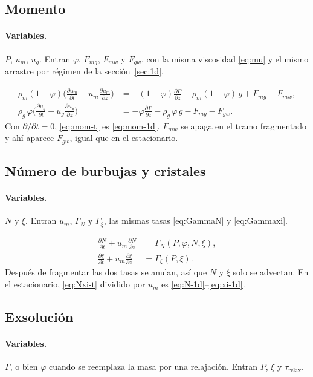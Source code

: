 \documentclass[11pt,a4paper]{article}
\newcommand{\p}{\partial}
\begin{document}
\subsection{Momento}

\paragraph{Variables.}
$P$, $u_m$, $u_g$. Entran $\varphi$, $F_{mg}$, $F_{mw}$ y $F_{gw}$,
con la misma viscosidad \eqref{eq:mu} y el mismo arrastre por
régimen de la sección~\ref{sec:1d}.

\begin{align}
\label{eq:mom-t}
\rho_m(1-\varphi)\Biggl(
\frac{\p u_m}{\p t}+u_m\frac{\p u_m}{\p z}
\Biggr)
&=
-(1-\varphi)\frac{\p P}{\p z}
-\rho_m(1-\varphi)\,g
+F_{mg}-F_{mw},
\\
\rho_g\,\varphi\Biggl(
\frac{\p u_g}{\p t}+u_g\frac{\p u_g}{\p z}
\Biggr)
&=
-\varphi\frac{\p P}{\p z}
-\rho_g\,\varphi\,g
-F_{mg}-F_{gw}.
\end{align}
Con $\p/\p t=0$, \eqref{eq:mom-t} es \eqref{eq:mom-1d}. $F_{mw}$ se
apaga en el tramo fragmentado y ahí aparece $F_{gw}$, igual que en
el estacionario.

\subsection{Número de burbujas y cristales}

\paragraph{Variables.}
$N$ y $\xi$. Entran $u_m$, $\Gamma_N$ y $\Gamma_\xi$, las mismas
tasas \eqref{eq:GammaN} y \eqref{eq:Gammaxi}.

\begin{align}
\label{eq:Nxi-t}
\frac{\p N}{\p t}+u_m\frac{\p N}{\p z}
&=\Gamma_N(P,\varphi,N,\xi),
\\
\frac{\p \xi}{\p t}+u_m\frac{\p \xi}{\p z}
&=\Gamma_\xi(P,\xi).
\end{align}
Después de fragmentar las dos tasas se anulan, así que $N$ y $\xi$
solo se advectan. En el estacionario, \eqref{eq:Nxi-t} dividido por
$u_m$ es \eqref{eq:N-1d}--\eqref{eq:xi-1d}.

\subsection{Exsolución}

\paragraph{Variables.}
$\Gamma$, o bien $\varphi$ cuando se reemplaza la masa por una
relajación. Entran $P$, $\xi$ y $\tau_{\mathrm{relax}}$.
\end{document}
